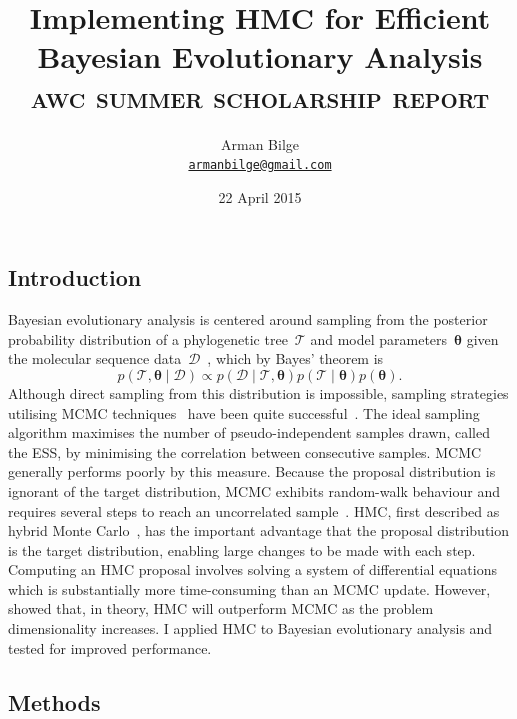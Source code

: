 \documentclass{article}
\title{Implementing \acl{HMC} for Efficient Bayesian Evolutionary Analysis \\
           \Large\textsc{awc summer scholarship report}}
\author{Arman Bilge \\ \texttt{\href{mailto:armanbilge@gmail.com}{armanbilge@gmail.com}}}
\date{22 April 2015}
\renewcommand{\vec}[1]{\ensuremath{\boldsymbol{\mathbf{#1}}}}
\begin{document}
    \maketitle

    \subsection*{Introduction}

    Bayesian evolutionary analysis is centered around sampling from the
        posterior probability distribution of a phylogenetic
        tree~$\mathcal{T}$ and model parameters~$\vec\theta$
        given the molecular sequence data~$\mathcal{D}$~\cite{Bou+14},
        which by Bayes' theorem is
        \begin{equation}
            p\left(\mathcal{T}, \vec\theta \mid \mathcal{D}\right)
                \propto p\left(\mathcal{D} \mid \mathcal{T},\vec\theta\right)
                p\left(\mathcal{T} \mid \vec\theta\right) p\left(\vec\theta\right).
        \end{equation}
    Although direct sampling from this distribution is impossible, sampling
        strategies utilising \ac{MCMC} techniques~\cite{Met+53} have been quite
        successful~\cite{Ron+12,Dru+12,Bou+14}.
    The ideal sampling algorithm maximises the number of pseudo-independent
        samples drawn, called the \ac{ESS}, by minimising the correlation
        between consecutive samples.
    \ac{MCMC} generally performs poorly by this measure.
    Because the proposal distribution is ignorant of the target distribution,
        \ac{MCMC} exhibits random-walk behaviour and requires several steps to
        reach an uncorrelated sample~\cite{Nea11}.
    \ac{HMC}, first described as hybrid Monte Carlo~\cite{Dua+87},
        has the important advantage that the proposal distribution is the
        target distribution, enabling large changes to be made with each step.
    Computing an \ac{HMC} proposal involves solving a system of differential
        equations which is substantially more time-consuming than an \ac{MCMC}
        update.
    However, \textcite{Nea11} showed that, in theory, \ac{HMC} will outperform
        \ac{MCMC} as the problem dimensionality increases.
    I applied \ac{HMC} to Bayesian evolutionary analysis and tested for
        improved performance.

    \subsection*{Methods}
\end{document}
